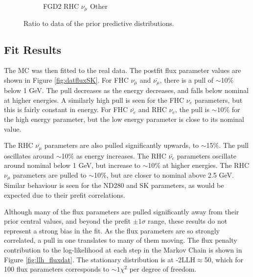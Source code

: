 \begin{figure}
\begin{subfigure}{.32\textwidth}
  \caption{FGD2 RHC $\nu_{\mu}$ Other}
  \label{fig:priorpred_FGD2_NuMuBkg_CCOther_in_AntiNu_Mode}
\end{subfigure}
\caption{Ratio to data of the prior predictive distributions.}
\label{fig:priorpreds}
\end{figure}

\subsection{Fit Results}

The MC was then fitted to the real data. The postfit flux parameter values are shown in Figure \ref{fig:datfluxSK}. For FHC $\nu_{\mu}$ and $\bar{\nu_{\mu}}$, there is a pull of $\sim$10$\%$ below 1 GeV. The pull decreases as the energy decreases, and falls below nominal at higher energies. A similarly high pull is seen for the FHC $\nu_e$ parameters, but this is fairly constant in energy. For FHC $\bar{\nu_e}$ and RHC $\nu_e$, the pull is $\sim10\%$ for the high energy parameter, but the low energy parameter is close to its nominal value.

The RHC $\bar{\nu_{\mu}}$ parameters are also pulled significantly upwards, to $\sim$15$\%$. The pull oscillates around $\sim$10$\%$ as energy increases. The RHC $\bar{\nu_e}$ parameters oscillate around nominal below 1 GeV, but increase to $\sim$10$\%$ at higher energies. The RHC $\nu_{\mu}$ parameters are pulled to $\sim$10$\%$, but are closer to nominal above 2.5 GeV. Similar behaviour is seen for the ND280 and SK parameters, as would be expected due to their prefit correlations.

Although many of the flux parameters are pulled significantly away from their prior central values, and beyond the prefit $\pm1\sigma$ range, these results do not represent a strong bias in the fit. As the flux parameters are so strongly correlated, a pull in one translates to many of them moving. The flux penalty contribution to the log-likelihood at each step in the Markov Chain is shown in Figure \ref{fig:llh_fluxdat}. The stationary distribution is at -2LLH$\approx$50, which for 100 flux parameters corresponds to $\sim1\chi^2$ per degree of freedom.

